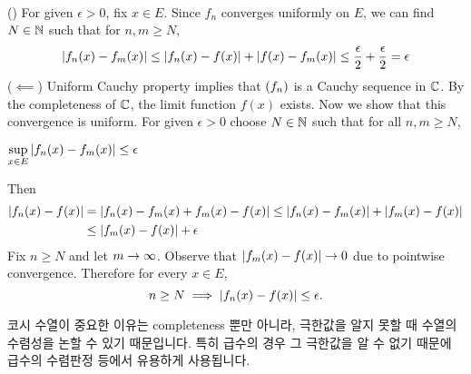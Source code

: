 \pf\\
(\mimp) For given \(\epsilon > 0\), fix \(x \in E\). Since \(f_n\) converges uniformly on \(E\), we can find \(N \in \mathbb{N}\) such that for \(n, m \geq N\),
\[
    \left| f_n(x) - f_m(x) \right| \leq \left| f_n(x) - f(x) \right| + \left| f(x) - f_m(x) \right| \leq \frac{\epsilon}{2} + \frac{\epsilon}{2} = \epsilon
\]
(\(\impliedby\)) Uniform Cauchy property implies that \(\left( f_n \right)\) is a Cauchy sequence in \(\mathbb{C}\). By the completeness of \(\mathbb{C}\), the limit function \(f(x)\) exists. Now we show that this convergence is uniform.
For given \(\epsilon > 0\) choose \(N \in \mathbb{N}\) such that for all \(n, m \geq N\),
\begin{center}
    \(\displaystyle \sup_{x \in E} \left| f_n(x) - f_m(x) \right| \leq \epsilon\)
\end{center}
Then
\[
    \begin{aligned}
        \left| f_n(x) - f(x) \right| &= \left| f_n(x) - f_m(x) + f_m(x) - f(x) \right| \leq \left| f_n(x) - f_m(x) \right| + \left| f_m(x) - f(x) \right|\\
        &\leq \left| f_m(x) - f(x) \right| + \epsilon
    \end{aligned}
\]
Fix \(n \geq N\) and let \(m \rightarrow \infty\). Observe that \(\left| f_m(x) - f(x) \right| \rightarrow 0\) due to pointwise convergence. Therefore for every \(x \in E\),
\[
    n \geq N \implies \left| f_n(x) - f(x) \right| \leq \epsilon.
\]

코시 수열이 중요한 이유는 completeness 뿐만 아니라, 극한값을 알지 못할 때 수열의 수렴성을 논할 수 있기 때문입니다. 특히 급수의 경우 그 극한값을 알 수 없기 때문에 급수의 수렴판정 등에서 유용하게 사용됩니다.

\pagebreak
